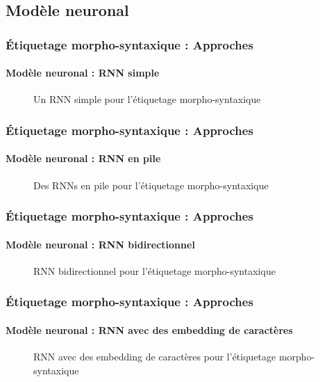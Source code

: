 \documentclass[xcolor=table]{beamer}
\begin{document}
\subsection{Modèle neuronal}

\begin{frame}
\frametitle{Étiquetage morpho-syntaxique : Approches}
\framesubtitle{Modèle neuronal : RNN simple}

\begin{figure}
	\centering
	\caption{Un RNN simple pour l'étiquetage morpho-syntaxique \cite{2019-jurafsky-martin}}
\end{figure}

\end{frame}

\begin{frame}
\frametitle{Étiquetage morpho-syntaxique : Approches}
\framesubtitle{Modèle neuronal : RNN en pile}

\begin{figure}
	\centering
	\caption{Des RNNs en pile pour l'étiquetage morpho-syntaxique \cite{2019-jurafsky-martin}}
\end{figure}

\end{frame}

\begin{frame}
\frametitle{Étiquetage morpho-syntaxique : Approches}
\framesubtitle{Modèle neuronal : RNN bidirectionnel}

\begin{figure}
	\centering
	\caption{RNN bidirectionnel pour l'étiquetage morpho-syntaxique \cite{2019-jurafsky-martin}}
\end{figure}

\end{frame}

\begin{frame}
\frametitle{Étiquetage morpho-syntaxique : Approches}
\framesubtitle{Modèle neuronal : RNN avec des embedding de caractères}

\begin{figure}
	\centering
	\caption{RNN avec des embedding de caractères pour l'étiquetage morpho-syntaxique \cite{2019-jurafsky-martin}}
\end{figure}

\end{frame}

\end{document}
